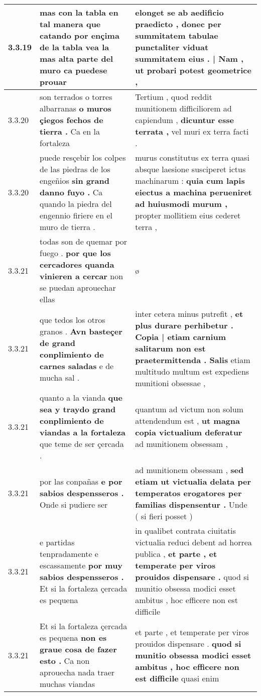 \begin{tabular}{|p{1cm}|p{6.5cm}|p{6.5cm}|}
3.3.19 & mas con la tabla en tal manera \textbf{ que catando por ençima de la tabla vea la mas alta parte del muro } ca puedese prouar & elonget se ab aedificio praedicto , \textbf{ donec per summitatem tabulae punctaliter viduat summitatem eius . | Nam , } ut probari potest geometrice , \\\hline
3.3.20 & son terrados o torres albarranas \textbf{ o muros çiegos fechos de tierra . } Ca en la fortaleza & Tertium , quod reddit munitionem difficiliorem ad capiendum , \textbf{ dicuntur esse terrata , } vel muri ex terra facti . \\\hline
3.3.20 & puede resçebir los colpes de las piedras de los engeñios \textbf{ sin grand danno fuyo . } Ca quando la piedra del engennio firiere en el muro de tierra . & murus constitutus ex terra quasi absque laesione susciperet ictus machinarum : \textbf{ quia cum lapis eiectus a machina perueniret ad huiusmodi murum , } propter mollitiem eius cederet terra , \\\hline
3.3.21 & todas son de quemar por fuego . \textbf{ por que los cercadores quanda vinieren a cercar } non se puedan aprouechar ellas & ø \\\hline
3.3.21 & que tedos los otros granos . \textbf{ Avn basteçer de grand conplimiento de carnes saladas } e de mucha sal . & inter cetera minus putrefit , \textbf{ et plus durare perhibetur . Copia | etiam carnium salitarum non est praetermittenda . Salis } etiam multitudo multum est expediens munitioni obsessae , \\\hline
3.3.21 & quanto a la vianda \textbf{ que sea y traydo grand conplimiento de viandas a la fortaleza } que teme de ser çercada . & quantum ad victum non solum attendendum est , \textbf{ ut magna copia victualium deferatur } ad munitionem obsessam , \\\hline
3.3.21 & por las conpañas \textbf{ e por sabios despensseros . } Onde si pudiere ser & ad munitionem obsessam , \textbf{ sed etiam ut victualia delata per temperatos erogatores per familias dispensentur . } Unde ( si fieri posset ) \\\hline
3.3.21 & e partidas tenpradamente e escassamente \textbf{ por muy sabios despensseros . } Et si la fortaleza çercada es pequena & in qualibet contrata ciuitatis victualia reduci debent ad horrea publica , \textbf{ et parte , et temperate per viros prouidos dispensare . } quod si munitio obsessa modici esset ambitus , hoc efficere non est difficile \\\hline
3.3.21 & Et si la fortaleza çercada es pequena \textbf{ non es graue cosa de fazer esto . } Ca non aprouecha nada traer muchas viandas & et parte , et temperate per viros prouidos dispensare . \textbf{ quod si munitio obsessa modici esset ambitus , hoc efficere non est difficile } quasi enim \\\hline

\end{tabular}
